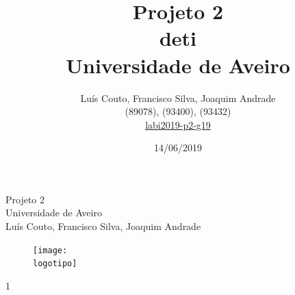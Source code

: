 \documentclass{report}
\begin{document}
%
\def\titulo{Projeto 2}
\def\data{14/06/2019}
\def\autores{Luís Couto, Francisco Silva, Joaquim Andrade}
\def\autorescontactos{(89078), (93400), (93432) }
\def\versao{1}
\def\departamento{\acs{deti}}
\def\empresa{Universidade de Aveiro}
\def\logotipo{ua.pdf}
\def\projeto{\href{https://code.ua.pt/projects/labi2019-p2-g19}{labi2019-p2-g19}}

%
%
\begin{titlepage}

\begin{center}
%
\vspace*{50mm}
%
{\Huge \titulo}\\ 
%
\vspace{10mm}
%
{\Large \empresa}\\
%
\vspace{10mm}
%
{\LARGE \autores}\\ 
%
\vspace{30mm}
%
\begin{figure}[h]
\center
\texttt{[image: \\logotipo]}
\end{figure}
%
\vspace{30mm}
\end{center}
%
\begin{flushright}
\versao
\end{flushright}
\end{titlepage}


\title{%
{\Huge\textbf{\titulo}}\\
{\Large \departamento\\ \empresa}
}
%
\author{%
    \autores \\
    \autorescontactos \\
    \projeto 
}
%
\date{\data}
%
\maketitle

 
\end{document}
